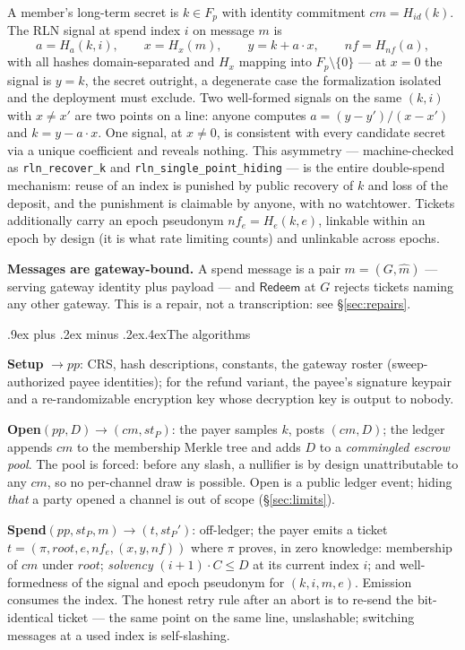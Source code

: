 \documentclass[9pt]{extarticle}
\makeatletter
\renewcommand\subsection{\@startsection{subsection}{2}{0pt}%
  {.9ex plus .2ex minus .2ex}{.4ex}{\normalfont\large\bfseries}}
\newcommand{\decl}[1]{\nolinkurl{#1}}
\makeatother
\begin{document}
A member's long-term secret is $k \in F_p$ with identity commitment
$cm = H_{id}(k)$. The RLN signal at spend index $i$ on message $m$
is~\cite{rlndocs,crapisbuterin2026credits}
\[
a = H_a(k, i), \qquad x = H_x(m), \qquad y = k + a \cdot x, \qquad
nf = H_{nf}(a),
\]
with all hashes domain-separated and $H_x$ mapping into
$F_p \setminus \{0\}$ --- at $x = 0$ the signal is $y = k$, the secret
outright, a degenerate case the formalization isolated and the deployment
must exclude. Two well-formed signals on the same $(k, i)$ with
$x \neq x'$ are two points on a line: anyone computes
$a = (y-y')/(x-x')$ and $k = y - a \cdot x$. One signal, at $x \neq 0$, is
consistent with every candidate secret via a unique coefficient and
reveals nothing. This asymmetry --- machine-checked as
\decl{rln_recover_k} and \decl{rln_single_point_hiding} --- is the
entire double-spend mechanism: reuse of an index is punished by public
recovery of $k$ and loss of the deposit, and the punishment is claimable
by anyone, with no watchtower. Tickets additionally carry an epoch
pseudonym $nf_e = H_e(k, e)$, linkable within an epoch by design (it is
what rate limiting counts) and unlinkable across epochs.

\textbf{Messages are gateway-bound.} A spend message is a pair
$m = (G, \hat{m})$ --- serving gateway identity plus payload --- and
$\mathsf{Redeem}$ at $G$ rejects tickets naming any other gateway. This is
a repair, not a transcription: see \S\ref{sec:repairs}.

\subsection{The algorithms}

\textbf{Setup} $\to pp$: CRS, hash descriptions, constants, the gateway
roster (sweep-authorized payee identities); for the refund variant, the
payee's signature keypair and a re-randomizable encryption key whose
decryption key is output to nobody.

\textbf{Open}$(pp, D) \to (cm, st_P)$: the payer samples $k$, posts
$(cm, D)$; the ledger appends $cm$ to the membership Merkle tree and adds
$D$ to a \emph{commingled escrow pool}. The pool is forced: before any
slash, a nullifier is by design unattributable to any $cm$, so no
per-channel draw is possible. Open is a public ledger event; hiding
\emph{that} a party opened a channel is out of scope (\S\ref{sec:limits}).

\textbf{Spend}$(pp, st_P, m) \to (t, st_P')$: off-ledger; the payer emits
a ticket $t = (\pi, root, e, nf_e, (x, y, nf))$ where $\pi$ proves, in
zero knowledge: membership of $cm$ under $root$; \emph{solvency}
$(i+1) \cdot C \le D$ at its current index $i$; and well-formedness of the
signal and epoch pseudonym for $(k, i, m, e)$. Emission consumes the
index. The honest retry rule after an abort is to re-send the
bit-identical ticket --- the same point on the same line, unslashable;
switching messages at a used index is self-slashing.
\end{document}
